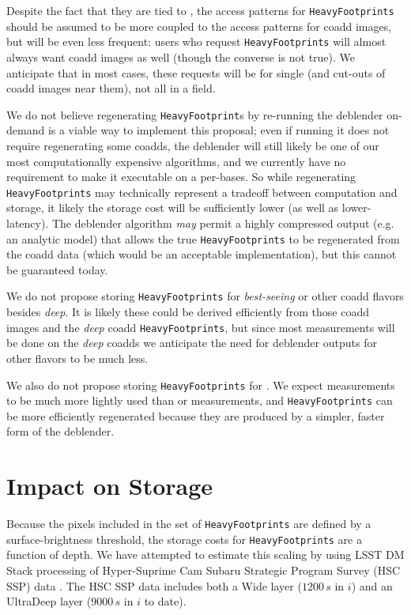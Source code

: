 \documentclass[DM,toc]{lsstdoc}
\begin{document}
Despite the fact that they are tied to \Objects, the access patterns for \texttt{HeavyFootprints} should be assumed to be more coupled to the access patterns for coadd images, but will be even less frequent: users who request \texttt{HeavyFootprints} will almost always want coadd images as well (though the converse is not true).  We anticipate that in most cases, these requests will be for single \Objects (and cut-outs of coadd images near them), not all \Objects in a field.

We do not believe regenerating \texttt{HeavyFootprint}s by re-running the deblender on-demand is a viable way to implement this proposal; even if running it does not require regenerating some coadds, the deblender will still likely be one of our most computationally expensive algorithms, and we currently have no requirement to make it executable on a per-\Object bases.  So while regenerating \texttt{HeavyFootprints} may technically represent a tradeoff between computation and storage, it likely the storage cost will be sufficiently lower (as well as lower-latency).  The deblender algorithm \emph{may} permit a highly compressed output (e.g. an analytic model) that allows the true \texttt{HeavyFootprints} to be regenerated from the coadd data (which would be an acceptable implementation), but this cannot be guaranteed today.

We do not propose storing \texttt{HeavyFootprints} for \emph{best-seeing} or other coadd flavors besides \emph{deep}.  It is likely these could be derived efficiently from those coadd images and the \emph{deep} coadd \texttt{HeavyFootprints}, but since most measurements will be done on the \emph{deep} coadds we anticipate the need for deblender outputs for other flavors to be much less.

We also do not propose storing \texttt{HeavyFootprints} for \Source.  We expect \Source measurements to be much more lightly used than \Object or \ForcedSource measurements, and \Source \texttt{HeavyFootprints} can be more efficiently regenerated because they are produced by a simpler, faster form of the deblender.

\section{Impact on Storage}

Because the pixels included in the set of \texttt{HeavyFootprints} are defined by a surface-brightness threshold, the storage costs for \texttt{HeavyFootprints} are a function of depth.  We have attempted to estimate this scaling by using LSST DM Stack processing of Hyper-Suprime Cam Subaru Strategic Program Survey (HSC SSP) data \citep{2017arXiv170208449A}.  The HSC SSP data includes both a Wide layer ($1200\,s$ in $i$) and an UltraDeep layer ($9000\,s$ in $i$ to date).
\end{document}
